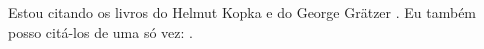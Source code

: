 \documentclass[a4paper,12pt]{article}
\begin{document}
	Estou citando os livros do Helmut Kopka \cite{Kopka:1999} e
	do George Grätzer \cite{Gratzer:1996}. Eu também posso citá-los
	de uma só vez: \cite{Kopka:1999,Gratzer:1996}.

	
\end{document}
